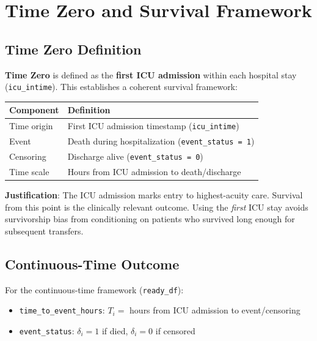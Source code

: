 \documentclass[11pt]{article}
\begin{document}
\section{Time Zero and Survival Framework}

\subsection{Time Zero Definition}

\textbf{Time Zero} is defined as the \textbf{first ICU admission} within each hospital stay (\texttt{icu\_intime}). This establishes a coherent survival framework:

\begin{center}
\begin{tabular}{ll}
\toprule
\textbf{Component} & \textbf{Definition} \\
\midrule
Time origin & First ICU admission timestamp (\texttt{icu\_intime}) \\
Event & Death during hospitalization (\texttt{event\_status = 1}) \\
Censoring & Discharge alive (\texttt{event\_status = 0}) \\
Time scale & Hours from ICU admission to death/discharge \\
\bottomrule
\end{tabular}
\end{center}

\textbf{Justification}: The ICU admission marks entry to highest-acuity care. Survival from this point is the clinically relevant outcome. Using the \textit{first} ICU stay avoids survivorship bias from conditioning on patients who survived long enough for subsequent transfers.

\subsection{Continuous-Time Outcome}

For the continuous-time framework (\texttt{ready\_df}):
\begin{itemize}[leftmargin=*, nosep]
    \item \texttt{time\_to\_event\_hours}: $T_i = $ hours from ICU admission to event/censoring
    \item \texttt{event\_status}: $\delta_i = 1$ if died, $\delta_i = 0$ if censored
\end{itemize}
\end{document}
